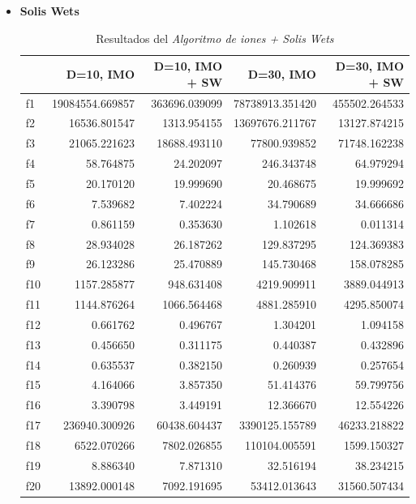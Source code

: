 \documentclass[a4paper,11pt]{article}
\begin{document}
\begin{itemize}
 \begin{itemize}
  \item \textbf{Solis Wets}
  \begin{table}[H]	
  \caption{Resultados del \textit{Algoritmo de iones + Solis Wets}}
  \centering
  \begin{tabular}{|l|r|r|||r|r|}
  \hline
  & \textbf{D=10, IMO} & \textbf{D=10, IMO + SW} & \textbf{D=30, IMO} & \textbf{D=30, IMO + SW}\\ \hline
  f1 &  19084554.669857 &  363696.039099 &  78738913.351420 &  455502.264533 \\ \hline
  f2 &  16536.801547 &  1313.954155 &  13697676.211767 &  13127.874215 \\ \hline
  f3 &  21065.221623 &  18688.493110 &  77800.939852 &  71748.162238 \\ \hline
  f4 &  58.764875 &  24.202097 &  246.343748 &  64.979294 \\ \hline
  f5 &  20.170120 &  19.999690 &  20.468675 &  19.999692 \\ \hline
  f6 &  7.539682 &  7.402224 &  34.790689 &  34.666686 \\ \hline
  f7 &  0.861159 &  0.353630 &  1.102618 &  0.011314 \\ \hline
  f8 &  28.934028 &  26.187262 &  129.837295 &  124.369383 \\ \hline
  f9 &  26.123286 &  25.470889 &  145.730468 &  158.078285 \\ \hline
  f10 &  1157.285877 &  948.631408 &  4219.909911 &  3889.044913 \\ \hline
  f11 &  1144.876264 &  1066.564468 &  4881.285910 &  4295.850074 \\ \hline
  f12 &  0.661762 &  0.496767 &  1.304201 &  1.094158 \\ \hline
  f13 &  0.456650 &  0.311175 &  0.440387 &  0.432896 \\ \hline
  f14 &  0.635537 &  0.382150 &  0.260939 &  0.257654 \\ \hline
  f15 &  4.164066 &  3.857350 &  51.414376 &  59.799756 \\ \hline
  f16 &  3.390798 &  3.449191 &  12.366670 &  12.554226 \\ \hline
  f17 &  236940.300926 &  60438.604437 &  3390125.155789 &  46233.218822 \\ \hline
  f18 &  6522.070266 &  7802.026855 &  110104.005591 &  1599.150327 \\ \hline
  f19 &  8.886340 &  7.871310 &  32.516194 &  38.234215 \\ \hline
  f20 &  13892.000148 &  7092.191695 &  53412.013643 &  31560.507434 \\ \hline
  \end{tabular}
  \end{table}


\end{itemize}
\end{itemize}
\end{document}
